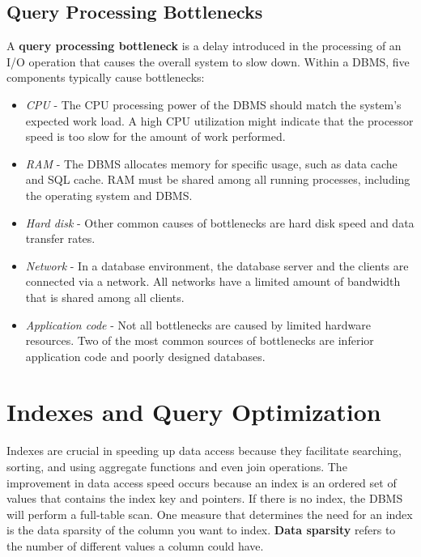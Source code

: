 \documentclass[a4paper, 11pt, titlepage]{report}
\begin{document}
\subsection{Query Processing Bottlenecks}
A \textbf{query processing bottleneck} is a delay introduced in the processing of an I/O operation that
causes the overall system to slow down. Within a DBMS, five components typically cause bottlenecks:
\begin{itemize}
\item \textit{CPU} - The CPU processing power of the DBMS should match the system's expected work load. A high CPU utilization might indicate that the processor speed is too slow for the amount of work performed.
\item \textit{RAM} - The DBMS allocates memory for specific usage, such as data cache and SQL cache. RAM must be shared among all running processes, including the operating system and DBMS.
\item \textit{Hard disk} - Other common causes of bottlenecks are hard disk speed and data transfer
rates.
\item \textit{Network} - In a database environment, the database server and the clients are connected via a network. All networks have a limited amount of bandwidth that is shared among all clients.
\item \textit{Application code} - Not all bottlenecks are caused by limited hardware resources. Two
of the most common sources of bottlenecks are inferior application code and poorly designed databases.
\end{itemize}
\section{Indexes and Query Optimization}
Indexes are crucial in speeding up data access because they facilitate searching, sorting, and using aggregate functions and even join operations. The improvement in data access speed occurs because an index is an ordered set of values that contains the index key and pointers. If there is no index, the DBMS will perform a full-table scan. One measure that determines the need for an index is the data sparsity of the column you want to index. \textbf{Data sparsity} refers to the number of different values a column could have.
\end{document}
